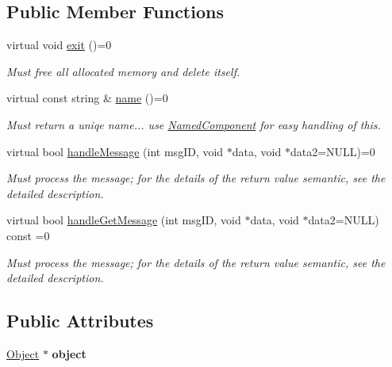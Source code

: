\subsection*{\-Public \-Member \-Functions}
\begin{DoxyCompactItemize}
\item 
\hypertarget{classComponent_a20c69384bdaaba048482af0a83b7a13d}{
virtual void \hyperlink{classComponent_a20c69384bdaaba048482af0a83b7a13d}{exit} ()=0}
\label{d8/d6b/classComponent_a20c69384bdaaba048482af0a83b7a13d}

\begin{DoxyCompactList}\small\item\em \-Must free all allocated memory and delete itself. \end{DoxyCompactList}\item 
\hypertarget{classComponent_a1aa5af742ac26a6d065e7005d7e1b3e0}{
virtual const string \& \hyperlink{classComponent_a1aa5af742ac26a6d065e7005d7e1b3e0}{name} ()=0}
\label{d8/d6b/classComponent_a1aa5af742ac26a6d065e7005d7e1b3e0}

\begin{DoxyCompactList}\small\item\em \-Must return a uniqe name... use \hyperlink{classNamedComponent}{\-Named\-Component} for easy handling of this. \end{DoxyCompactList}\item 
virtual bool \hyperlink{classComponent_a5c34b629ba4b6e2925045ef965d4d560}{handle\-Message} (int msg\-I\-D, void $\ast$data, void $\ast$data2=\-N\-U\-L\-L)=0
\begin{DoxyCompactList}\small\item\em \-Must process the message; for the details of the return value semantic, see the detailed description. \end{DoxyCompactList}\item 
virtual bool \hyperlink{classComponent_aee22af179cf21f929cd273a22bc6324c}{handle\-Get\-Message} (int msg\-I\-D, void $\ast$data, void $\ast$data2=\-N\-U\-L\-L) const =0
\begin{DoxyCompactList}\small\item\em \-Must process the message; for the details of the return value semantic, see the detailed description. \end{DoxyCompactList}\end{DoxyCompactItemize}
\subsection*{\-Public \-Attributes}
\begin{DoxyCompactItemize}
\item 
\hypertarget{classComponent_a2aa0e777f7b39ffc4e57b04fdf6293e7}{
\hyperlink{classObject}{\-Object} $\ast$ {\bfseries object}}
\label{d8/d6b/classComponent_a2aa0e777f7b39ffc4e57b04fdf6293e7}

\end{DoxyCompactItemize}


